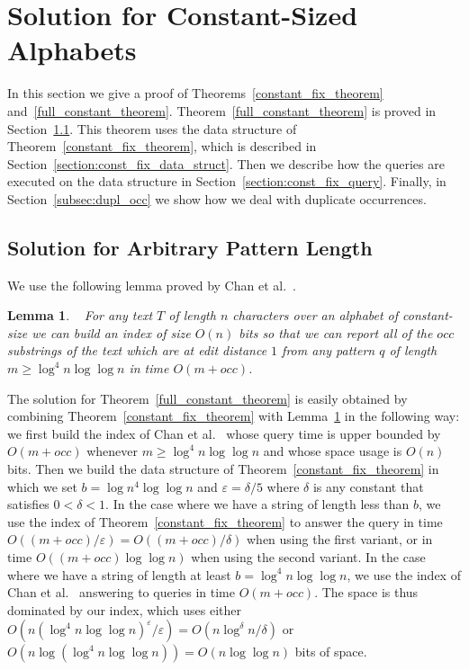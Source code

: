 \documentclass{article}
\newcommand{\?}{\mskip1.5mu}
\renewcommand{\epsilon}{\varepsilon}
\newtheorem{lemma}{Lemma}
\begin{document}
\section{Solution for Constant-Sized Alphabets}
\label{section:const_alpha}
In this section we give a proof of Theorems~\ref{constant_fix_theorem} and~\ref{full_constant_theorem}. 
Theorem~\ref{full_constant_theorem} is proved in Section~\ref{section:arb_const_query}. This theorem uses the data structure of Theorem~\ref{constant_fix_theorem}, which is described in Section~\ref{section:const_fix_data_struct}. Then  we describe how the queries are executed on the data structure in Section~\ref{section:const_fix_query}. Finally, in Section~\ref{subsec:dupl_occ} we show how we deal with duplicate occurrences. 
\subsection{Solution for Arbitrary Pattern Length}
\label{section:arb_const_query}
We use the following lemma proved by Chan et al.~\cite[Section 3.2]{chan2011linear}.
\begin{lemma}~\cite[Section 3.2]{chan2011linear}
\label{CLSTW06b0_fix_lemma}
For any text $T$ of length $n$ characters over an alphabet of constant-size we can build an index of size $O(n)$ bits so that we can report all of the $occ$ substrings of the text which are at edit distance $1$ from any pattern $q$ of length $m\geq \log^4 n\log\log n$ in time $O(m+occ)$. 
\end{lemma}

The solution for Theorem~\ref{full_constant_theorem} is easily obtained by combining Theorem~\ref{constant_fix_theorem} with Lemma~\ref{CLSTW06b0_fix_lemma} in the following way: we first build the index of Chan et al.~\cite{chan2011linear} whose query time is upper bounded by $O(m+occ)$ whenever $m\geq \log^4 n\log\log n$ and whose space usage is $O(n)$ bits. Then we build the data structure of Theorem~\ref{constant_fix_theorem} in which we set $b=\log n^4\log\log n$ and $\epsilon=\delta/5$ where $\delta$ is any constant that satisfies $0<\delta<1$. In the case where we have a string of length less than $b$, we use the index of Theorem~\ref{constant_fix_theorem} to answer the query in time $O((m+occ)/\epsilon)=O((m+occ)/\delta)$ when using the first variant, or in time $O((m+occ)\log\log n)$ when using the second variant. In the case where we have a string of length at least $b=\log^4 n\log\log n$, we use the index of Chan et al.~\cite{chan2011linear} answering to queries in time $O(m+occ)$. The space is thus dominated by our index, which uses either $O(n(\log^4 n\log\log n)^{\epsilon}/\epsilon)=O(n\log^\delta n/\delta)$ or $O(n\log(\log^4 n\log\log n))=O(n\log\log n)$ bits of space. 
\end{document}
